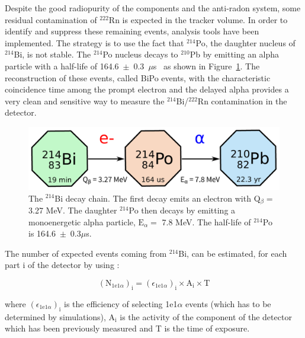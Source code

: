 \documentclass[main.tex]{subfiles}
\begin{document}
\noindent Despite the good radiopurity of the components and the anti-radon system, some residual contamination of $^{\text{222}}$Rn is expected in the tracker volume. In order to identify and suppress these remaining events, analysis tools have been implemented. The strategy is to use the fact that $^{\text{214}}$Po, the daughter nucleus of $^{\text{214}}$Bi, is not stable. The $^{\text{214}}$Po nucleus decays to $^{\text{210}}$Pb by emitting an alpha particle with a half-life of 164.6~$\pm$~0.3~$\mu$s~\cite{NuclearDataSheet210} as shown in Figure~\ref{BiPoChain}. The reconstruction of these events, called BiPo events, with the characteristic coincidence time among the prompt electron and the delayed alpha provides a very clean and sensitive way to measure the $^{\text{214}}$Bi/$^{\text{222}}$Rn contamination in the detector.   


\begin{figure}[h!]
\begin{center}
\includegraphics[scale=0.6]{pictures/Chap5/decay_chain_bi.pdf}
\caption{The $^{\text{214}}$Bi decay chain. The first decay emits an electron with Q$_{\beta} =$ 3.27 MeV. The daughter $^{\text{214}}$Po then decays by emitting a monoenergetic alpha particle, $\text{E}_{\alpha} =$ 7.8 MeV. The half-life of $^{\text{214}}$Po is 164.6~$\pm$~0.3$\mu$s.}
\label{BiPoChain}
\end{center}
\end{figure}


\bigskip


\NI The number of expected events coming from $^{\text{214}}$Bi, can be estimated, for each part i of the detector by using :


\begin{equation}
(\text{N}_{\text{1e1}\alpha})_\text{i} = (\epsilon_{\text{1e1}\alpha})_\text{i} \times \text{A}_\text{i} \times \text{T}
\label{eq_number_of_expected_events}
\end{equation}


\noindent where $(\epsilon_{\text{1e1}\alpha})_\text{i}$ is the efficiency of selecting 1e1$\alpha$ events (which has to be determined by simulations), A$_\text{i}$ is the activity of the component of the detector which has been previously measured and T is the time of exposure. 
\end{document}
